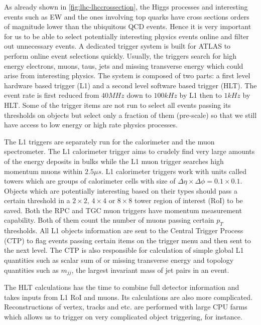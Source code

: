 \label{sec:detector-trigger}

As already shown in \ref{fig:lhc-lhccrossection}, the Higgs processes and interesting events such as EW and the ones involving top quarks have cross sections orders of magnitude lower than the ubiquitous QCD events. Hence it is very important for us to be able to select potentially interesting physics events online and filter out unnecessary events. A dedicated trigger system is built for ATLAS to perform online event selections quickly. Usually, the triggers search for high energy electrons, muons, taus, jets and missing transverse energy which could arise from interesting physics. The system is composed of two parts: a first level hardware based trigger (L1) and a second level software based trigger (HLT). The event rate is first reduced from $40MHz$ down to $100kHz$ by L1 then to $1kHz$ by HLT. Some of the trigger items are not run to select all events passing its thresholds on objects but select only a fraction of them (pre-scale) so that we still have access to low energy or high rate physics processes. 

The L1 triggers are separately run for the calorimeter and the muon spectrometer. The L1 calorimeter trigger aims to crudely find very large amounts of the energy deposits in bulks while the L1 muon trigger searches high momentum muons within $2.5\mu s$. L1 calorimeter triggers work with units called towers which are groups of calorimeter cells with size of $\Delta \eta \times \Delta \phi = 0.1\times0.1$. Objects which are potentially interesting based on their types should pass a certain threshold in a $2\times2$, $4\times4$ or $8\times8$ tower region of interest (RoI) to be saved. Both the RPC and TGC muon triggers have momentum measurement capability. Both of them count the number of muons passing certain $p_T$ thresholds. All L1 objects information are sent to the Central Trigger Process (CTP) to flag events passing certain items on the trigger menu and then sent to the next level. The CTP is also responsible for calculation of simple global L1 quantities such as scalar sum of or missing transverse energy and topology quantities such as $m_{jj}$, the largest invariant mass of jet pairs in an event. 

The HLT calculations has the time to combine full detector information and takes inputs from L1 RoI and muons. Its calculations are also more complicated. Reconstructions of vertex, tracks and etc. are performed with large CPU farms which allows us to trigger on very complicated object triggering, \bjets for instance. 
